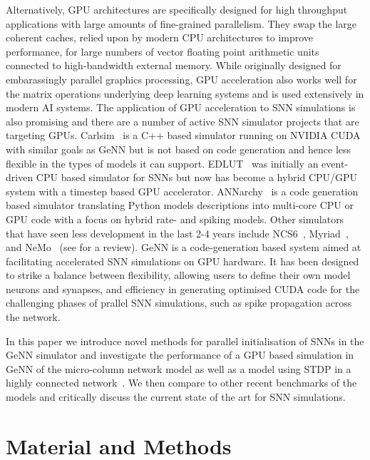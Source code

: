 \documentclass[utf8]{frontiersSCNS} %
\begin{document}
Alternatively, GPU architectures are specifically designed for high throughput applications with large amounts of fine-grained parallelism.
They swap the large coherent caches, relied upon by modern CPU architectures to improve performance, for large numbers of vector floating point arithmetic units connected to high-bandwidth external memory. While originally designed for embarassingly parallel graphics processing, GPU acceleration also works well for the matrix operations underlying deep learning systems and is used extensively in modern AI systems. The application of GPU acceleration to SNN simulations is also promising and there are a number of active SNN simulator projects that are targeting GPUs. Carlsim~\citep{Chou2018} is a C++ based simulator running on NVIDIA CUDA with similar goals as GeNN but is not based on code generation and hence less flexible in the types of models it can support.
EDLUT~\citep{Garrido2011} was initially an event-driven CPU based simulator for SNNs but now has become a hybrid CPU/GPU system with a timestep based GPU accelerator.
ANNarchy~\citep{Vitay2015} is a code generation based simulator translating Python models descriptions into multi-core CPU or GPU code with a focus on hybrid rate- and spiking models.
Other simulators that have seen less development in the last 2-4 years include NCS6~\citep{Hoang2013}, Myriad~\citep{Rittner2016}, and NeMo~\citep{Fidjeland2009} (see \citet{Brette2012} for a review).
GeNN \citep{Yavuz2016} is a code-generation based system aimed at facilitating accelerated SNN simulations on GPU hardware. It has been designed to strike a balance between flexibility, allowing users to define their own model neurons and synapses, and efficiency in generating optimised CUDA code for the challenging phases of prallel SNN simulations, such as spike propagation across the network.

In this paper we introduce novel methods for parallel initialisation of SNNs in the GeNN simulator and investigate the performance of a GPU based simulation in GeNN of the micro-column network model \cite{Potjans2012,VanAlbada2018} as well as a model using STDP in a highly connected network~\citep{Morrison2007}. We then compare to other recent benchmarks of the models \citep{VanAlbada2018} and critically discuss the current state of the art for SNN simulations.

\section{Material and Methods}
\label{sec:method}
\end{document}
